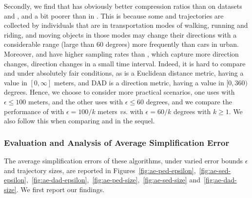 Secondly, {we find that \sed has obviously better compression ratios than \dad on datasets \geolife and \mopsi, and a bit poorer than \dad in \ucar.}
This is because some \geolife and \mopsi trajectories are collected by individuals that are in transportation modes of walking, running and riding, and moving objects in those modes may change their directions with a considerable range (\eg large than $60$ degrees) more frequently than cars in urban. Moreover, \geolife and \mopsi have higher sampling rates than \ucar, which capture more direction changes, \ie direction changes in a small time interval.
%
{Indeed, it is hard to compare \sed and \dad under absolutely fair conditions, as \sed is a Euclidean distance metric, having a value in $[0, \infty]$ meters, and DAD is a direction metric,  having a value in $[0,360)$ degrees. Hence, we choose to consider more practical scenarios, \ie one uses \sed with $\epsilon  \le  100$ meters, and the other uses \dad with $\epsilon \le 60$ degrees, and we compare the performance of \sed with $\epsilon=100/k$ meters \emph{vs.} \dad with $\epsilon=60/k$ degrees with $k \ge 1$. We also follow this when comparing \sed and \dad in the sequel.}








\subsubsection{Evaluation and {Analysis} of Average Simplification Error}
\label{sec-ae}
The average simplification errors of these algorithms, under varied error bounds $\epsilon$ and trajectory sizes, are reported in Figures~\ref{fig:ae-ped-epsilon},~\ref{fig:ae-sed-epsilon},~\ref{fig:ae-dad-epsilon},~\ref{fig:ae-ped-size},~\ref{fig:ae-sed-size} and~\ref{fig:ae-dad-size}.
We first report our findings.







